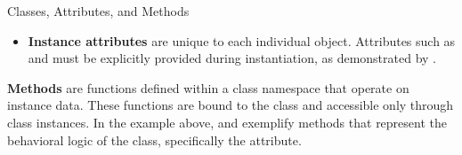 \documentclass[10pt]{article}
\begin{document}
\begin{core}{Classes, Attributes, and Methods}
\begin{itemize}
        \item \textbf{Instance attributes} are unique to each individual object. Attributes such as  and  must be explicitly provided during instantiation, as demonstrated by .

      \end{itemize}

      \textbf{Methods} are functions defined within a class namespace that operate on instance data. These functions are bound to the class and accessible only through class instances. In the example above,  and  exemplify methods that represent the behavioral logic of the  class, specifically the  attribute.

    \end{core}
\end{document}
